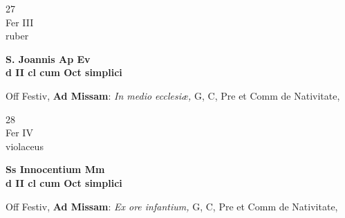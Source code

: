 \documentclass[10pt, openany]{book}
\begin{document}
        \begin{center}
            \begin{minipage}{3.5in}
                \vspace{2em}
                \begin{minipage}{0.5in}
                    {\Huge 27} \\
                    {\normalsize Fer III} \\
                    {\normalsize ruber}
                \end{minipage}
                \begin{minipage}{3.0in}
                    \textbf{ \large S. Joannis Ap Ev \\
                    \textnormal{\normalsize d II cl cum Oct simplici}} \\ 
                \end{minipage}
                \begin{justify}Off Festiv, \textbf{Ad Missam}: \textit{In medio ecclesiæ,} G, C, Pre et Comm de Nativitate,  
                \end{justify}
            \end{minipage}
        \end{center}
    
        \begin{center}
            \begin{minipage}{3.5in}
                \vspace{2em}
                \begin{minipage}{0.5in}
                    {\Huge 28} \\
                    {\normalsize Fer IV} \\
                    {\normalsize violaceus}
                \end{minipage}
                \begin{minipage}{3.0in}
                    \textbf{ \large Ss Innocentium Mm \\
                    \textnormal{\normalsize d II cl cum Oct simplici}} \\ 
                \end{minipage}
                \begin{justify}Off Festiv, \textbf{Ad Missam}: \textit{Ex ore infantium,} G, C, Pre et Comm de Nativitate,  
                \end{justify}
            \end{minipage}
        \end{center}
    
\end{document}

